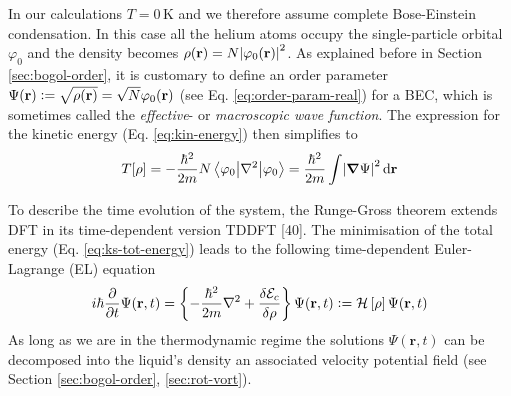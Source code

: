 \documentclass[12pt,a4paper]{book}
\renewcommand{\vec}[1]{\bm{\mathrm{#1}}}
\newcommand{\unit}[1]{\,\mathrm{#1}}
\newcommand{\diff}[1]{\,\mathrm{d}{\vec{#1}}}
\begin{document}
		In our calculations $T=0\unit{K}$ and we therefore assume complete Bose-Einstein condensation. In this case all the helium atoms occupy the single-particle orbital $\varphi_0$ and the density becomes $\rho(\vec{r})=N\absolutevalue{\varphi_0(\vec{r})}^2$. As explained before in Section \ref{sec:bogol-order}, it is customary to define an order parameter $\Psi(\vec{r})\vcentcolon=\sqrt{\rho(\vec{r})}=\sqrt{N}\varphi_0(\vec{r})$ (see Eq. \ref{eq:order-param-real}) for a BEC, which is sometimes called the \emph{effective}- or \emph{macroscopic wave function}. The expression for the kinetic energy (Eq. \ref{eq:kin-energy}) then simplifies to
		\begin{align}
			T[\rho] =
			-\frac{\hbar^2}{2m} N \ev**{\laplacian}{\varphi_0} = \frac{\hbar^2}{2m} \int\! \abs{\grad{\Psi}}^2\diff{r} \label{eq5}
		\end{align}
		
		To describe the time evolution of the system, the Runge-Gross theorem extends DFT in its time-dependent version TDDFT [40]. The minimisation of the total energy (Eq. \ref{eq:ks-tot-energy}) leads to the following time-dependent Euler-Lagrange (EL) equation 
		\begin{align}
			i\hbar\frac{\partial}{\partial t} \Psi({\mathbf r},t) = \left\{-\frac{\hbar^2}{2m}\laplacian + \frac{\delta{\cal E}_{c}}{\delta\rho}\right\}\Psi(\textbf{r},t) \vcentcolon= {\cal H}\left[\rho\right]\Psi(\textbf{r},t) 
			\label{eq:td-el-equation}
		\end{align}
		As long as we are in the thermodynamic regime the solutions $\Psi(\textbf{r},t)$ can be decomposed into the liquid's density an associated velocity potential field (see Section \ref{sec:bogol-order}, \ref{sec:rot-vort}).\\
		
\end{document}
